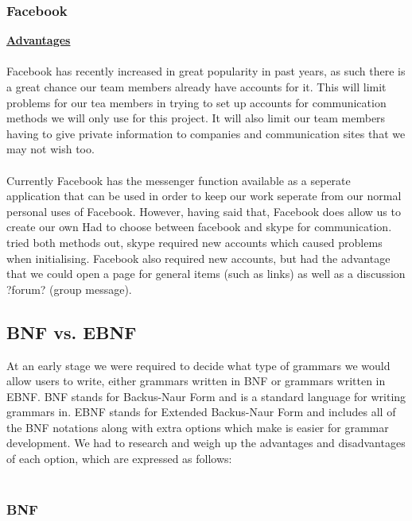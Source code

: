 \documentclass{l3proj}
\begin{document}
\subsubsection{Facebook}
\textbf {\underline{Advantages}}\\
\\
Facebook has recently increased in great popularity in past years, as such there is a great chance our team members already have accounts for it. This will limit problems for our tea members in trying to set up accounts for communication methods we will only use for this project. It will also limit our team members having to give private information to companies and communication sites that we may not wish too.\\
\\
Currently Facebook has the messenger function available as a seperate application that can be used in order to keep our work seperate from our normal personal uses of Facebook. However, having said that, Facebook does allow us to create our own 
Had to choose between facebook and skype for communication.
tried both methods out, skype required new accounts which caused problems when initialising. Facebook also required new accounts, but had the advantage that we could open a page for general items (such as links) as well as a discussion ?forum? (group message). 


\subsection{BNF vs. EBNF}
At an early stage we were required to decide what type of grammars we would allow users to write, either grammars written in BNF or grammars written in EBNF. BNF stands for Backus-Naur Form and is a standard language for writing grammars in. EBNF stands for Extended Backus-Naur Form and includes all of the BNF notations along with extra options which make is easier for grammar development. We had to research and weigh up the advantages and disadvantages of each option, which are expressed as follows:\\
\\
\subsubsection{BNF}
\end{document}
